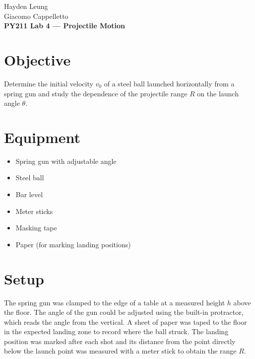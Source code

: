 \documentclass[12pt]{article}
\begin{document}
\begin{center}
    {\large Hayden Leung \\ Giacomo Cappelletto \\ \textbf{PY211 Lab 4 --- Projectile Motion}}
\end{center}

\section*{Objective}
Determine the initial velocity $v_0$ of a steel ball launched horizontally from a spring gun and study the dependence of the projectile range $R$ on the launch angle $\theta$.

\section*{Equipment}
\begin{itemize}[nosep]
    \item Spring gun with adjustable angle
    \item Steel ball
    \item Bar level
    \item Meter sticks
    \item Masking tape
    \item Paper (for marking landing positions)
\end{itemize}

\section*{Setup}
The spring gun was clamped to the edge of a table at a measured height $h$ above the floor. The angle of the gun could be adjusted using the built-in protractor, which reads the angle from the vertical. A sheet of paper was taped to the floor in the expected landing zone to record where the ball struck. The landing position was marked after each shot and its distance from the point directly below the launch point was measured with a meter stick to obtain the range $R$.
\end{document}
